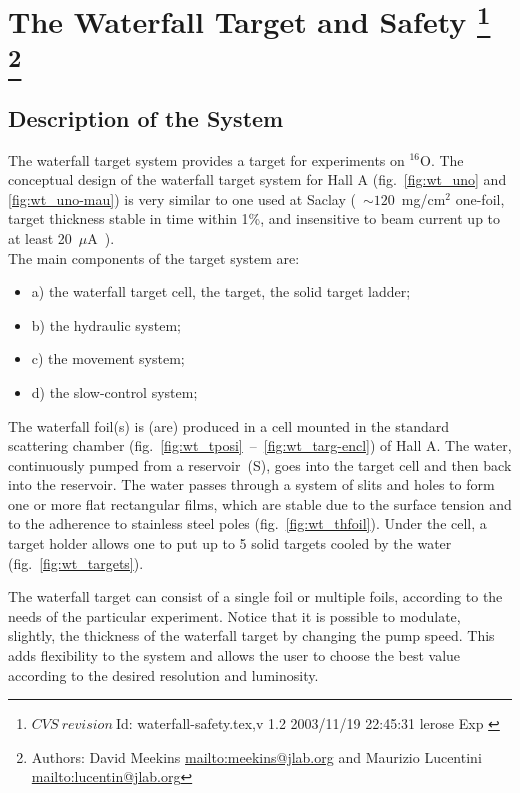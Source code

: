\chapter[The Waterfall Target and Safety]{The Waterfall Target and Safety
\footnote{
  $CVS~revision~ $Id: waterfall-safety.tex,v 1.2 2003/11/19 22:45:31 lerose Exp $ $
}
\footnote{Authors: David Meekins \url{mailto:meekins@jlab.org} and 
 Maurizio Lucentini \url{mailto:lucentin@jlab.org}}
}

\section{Description of the System}

The waterfall target system provides a target for experiments on $^{16}$O.
The conceptual design of the waterfall target system for Hall A (fig.~\ref{fig:wt_uno}
and \ref{fig:wt_uno-mau}) is very similar to one used at Saclay (~$\sim 120$~mg/cm$^{2}$
one-foil, target thickness stable in time within 1\%, and insensitive
to beam current up to at least 20~$\mu $A~\cite{Garibaldi:1992mb}).\\


The main components of the target system are: 

\begin{itemize}
\item a) the waterfall target cell, the target, the solid target ladder; 
\item b) the hydraulic system; 
\item c) the movement system; 
\item d) the slow-control system; 
\end{itemize}
The waterfall foil(s) is (are) produced in a cell mounted in the standard
scattering chamber (fig.~\ref{fig:wt_tposi}~--~\ref{fig:wt_targ-encl}) of Hall
A. The water, continuously pumped from a reservoir~(S), goes into
the target cell and then back into the reservoir. The water passes
through a system of slits and holes to form one or more flat rectangular
films, which are stable due to the surface tension and to the adherence
to stainless steel poles (fig.~\ref{fig:wt_thfoil}). Under the cell, a
target holder allows one to put up to 5 solid targets cooled by the
water (fig.~\ref{fig:wt_targets}).

The waterfall target can consist of a single foil or multiple foils,
according to the needs of the particular experiment. Notice that it
is possible to modulate, slightly, the thickness of the waterfall
target by changing the pump speed. This adds flexibility to the system
and allows the user to choose the best value according to the desired
resolution and luminosity.


